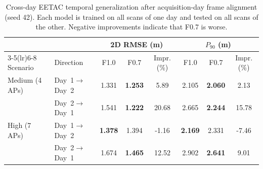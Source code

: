 \begin{table}[!t]
\centering
\caption{Cross-day EETAC temporal generalization after acquisition-day frame alignment (seed 42). Each model is trained on all scans of one day and tested on all scans of the other. Negative improvements indicate that F0.7 is worse.}
\label{tab:cross_day}
\footnotesize
\setlength{\tabcolsep}{5pt}
\begin{tabular}{llcccccc}
\toprule
 & & \multicolumn{3}{c}{2D RMSE (m)} & \multicolumn{3}{c}{$P_{90}$ (m)} \\
\cmidrule(lr){3-5}\cmidrule(lr){6-8}
Scenario & Direction & F1.0 & F0.7 & Impr. (\%) & F1.0 & F0.7 & Impr. (\%) \\
\midrule
Medium (4 APs) & Day~1$\rightarrow$Day~2 & 1.331 & \textbf{1.253} & 5.89 & 2.105 & \textbf{2.060} & 2.13 \\
 & Day~2$\rightarrow$Day~1 & 1.541 & \textbf{1.222} & 20.68 & 2.665 & \textbf{2.244} & 15.78 \\
\midrule
High (7 APs) & Day~1$\rightarrow$Day~2 & \textbf{1.378} & 1.394 & -1.16 & \textbf{2.169} & 2.331 & -7.46 \\
 & Day~2$\rightarrow$Day~1 & 1.674 & \textbf{1.465} & 12.52 & 2.902 & \textbf{2.641} & 9.01 \\
\bottomrule
\end{tabular}
\end{table}
